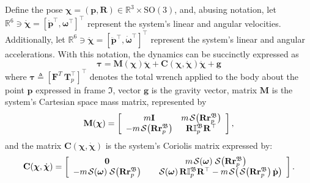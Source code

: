 Define the pose $\boldsymbol{\chi} = (\mathbf{p}, \mathbf{R}) \in \mathbb{R}^3\times \text{SO}(3)$, and, abusing notation, let $\mathbb{R}^6\ni\dot{\boldsymbol{\chi}} = \left[\dot{\mathbf{p}}^\top, \boldsymbol{\omega}^\top \right]^\top$ represent the system's linear and angular velocities. Additionally, let $\mathbb{R}^6\ni\ddot{\boldsymbol{\chi}} = \left[\ddot{\mathbf{p}}^\top, \dot{\boldsymbol{\omega}}^\top \right]^\top$ represent the system's linear and angular accelerations.
With this notation, the dynamics can be succinctly expressed as
\begin{equation}
    \boldsymbol{\tau } = \mathbf {M}(\boldsymbol{\chi})\ddot{\boldsymbol{\chi}} + \mathbf {C}(\boldsymbol{\chi},\dot{\boldsymbol{\chi}})\dot{\boldsymbol{\chi}} + \mathbf{g}\label{eq:tau}
\end{equation}
where $\boldsymbol{\tau}\triangleq[\mathbf{F}^{T}\ \mathbf{T}_p^\top]^\top$ denotes the total wrench applied to the body about the point $\mathbf{p}$ expressed in frame $\mathfrak{I}$, vector $\mathbf{g}$ is the gravity vector, matrix $\mathbf{M}$ is the system's Cartesian space mass matrix, represented by
\begin{equation}
    \mathbf {M}(\boldsymbol{\chi}) = \left[\begin{array}{cc}m\mathbf {I} & m\SL[\mathbf {R} \mathbf {r}_p^\mathfrak{B}] \\ -m\SL[\mathbf {R} \mathbf {r}_p^\mathfrak{B}] & \mathbf {R} \mathbb{I}^\mathfrak{B}_p \mathbf {R}^\top \end{array} \right],\label{eq:Mcartesian}
\end{equation}
and the matrix $\mathbf {C}(\boldsymbol{\chi},\dot{\boldsymbol{\chi}})$ is the system's Coriolis matrix expressed by:
\begin{equation}
    \mathbf {C}(\boldsymbol{\chi},\dot{\boldsymbol{\chi}}) = \left[\begin{array}{cc}\boldsymbol{0}& m\SL[\boldsymbol{\omega }] \SL[\mathbf {R} \mathbf {r}_p^\mathfrak{B}] \\ -m\SL[\boldsymbol{\omega }]\SL[\mathbf {R} \mathbf {r}_p^\mathfrak{B}] & \quad\SL[\boldsymbol{\omega }] \mathbf {R}\mathbb{I}_p^\mathfrak{B}\mathbf {R}^\top 
    -m\SL[\SL[\mathbf {R}\mathbf {r}_p^\mathfrak{B}] \dot{\mathbf{p}}] \end{array} \right]. \label{eq:C}
\end{equation}


